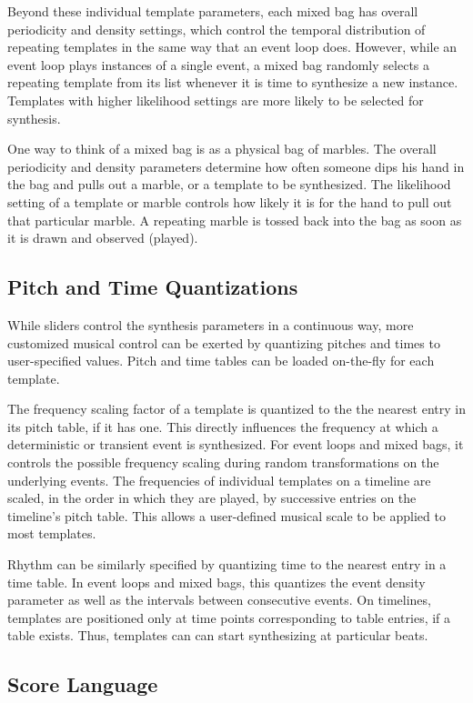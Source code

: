 \documentclass[10pt,letterpaper]{article}
\begin{document}
Beyond these individual template parameters, each mixed bag has overall
periodicity and density settings, which control the temporal
distribution of repeating templates in the same way that an event loop
does. However, while an event loop plays instances of a single event, a
mixed bag randomly selects a repeating template from its list whenever
it is time to synthesize a new instance. Templates with higher
likelihood settings are more likely to be selected for synthesis. 

One way to think of a mixed bag is as a physical bag of marbles. The
overall periodicity and density parameters determine how often someone
dips his hand in the bag and pulls out a marble, or a template to be
synthesized. The likelihood setting of a template or marble controls how
likely it is for the hand to pull out that particular marble. A
repeating marble is tossed back into the bag as soon as it is
drawn and observed (played).

\subsection{Pitch and Time Quantizations}

While sliders control the synthesis parameters in a continuous way, more customized musical control can be exerted by quantizing pitches and times to user-specified values. Pitch and time tables can be loaded on-the-fly for each template. 

The frequency scaling factor of a template is quantized to the the nearest entry in its pitch table, if it has one. This directly influences the frequency at which a deterministic or transient event is synthesized. For event loops and mixed bags, it controls the possible frequency scaling during random transformations on the underlying events. The frequencies of individual templates on a timeline are scaled, in the order in which they are played, by successive entries on the timeline's pitch table. This allows a user-defined musical scale to be applied to most templates. 

Rhythm can be similarly specified by quantizing time to the nearest entry in a time table. In event loops and mixed bags, this quantizes the event density parameter as well as the intervals between consecutive events. On timelines, templates are positioned only at time points corresponding to table entries, if a table exists. Thus, templates can can start synthesizing at particular beats. 

\subsection{Score Language}
\end{document}
